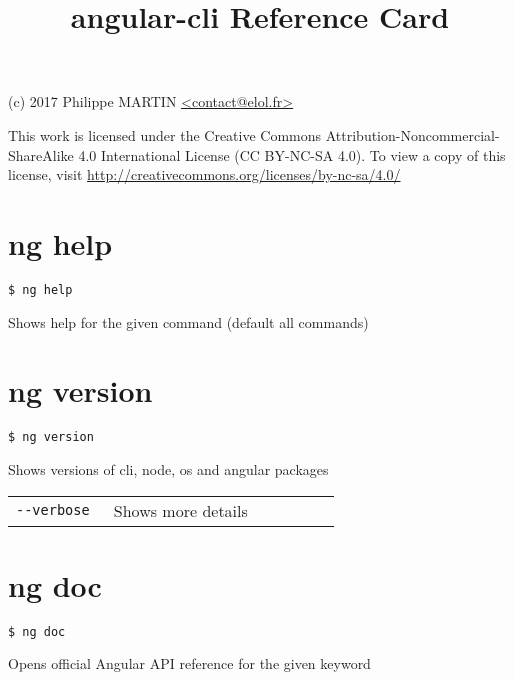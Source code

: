 \documentclass[8pt]{extarticle} %
\begin{document}
\raggedright

\begin{multicols}{3}

\title{angular-cli Reference Card}

{\small
(c) 2017 Philippe MARTIN \url{<contact@elol.fr>}

This work is licensed under the Creative Commons Attribution-Noncommercial-ShareAlike 
4.0 International License (CC BY-NC-SA 4.0). To view a copy of this license, visit
\url{http://creativecommons.org/licenses/by-nc-sa/4.0/}
}

\vspace*{1pt}

\section*{ng help}
  \vspace{1ex}
  {\tt \$ ng help }

  \vspace{0.6ex}

  {\small Shows help for the given command (default all commands)}

\section*{ng version}

  \vspace{1ex}
  {\tt \$ ng version \itt{[options...]}}

  \vspace{0.6ex}

  {\small Shows versions of cli, node, os and angular packages}

  \vspace{0.6ex}

  \begin{tabular}{L{0.30\linewidth} L{0.70\linewidth}}
    \tt -{}-verbose & \small Shows more details
  \end{tabular}

\section*{ng doc}

  \vspace{1ex}
  {\tt \$ ng doc }

  \vspace{0.6ex}

  {\small Opens official Angular API reference for the given keyword}


\end{multicols}
\end{document}
